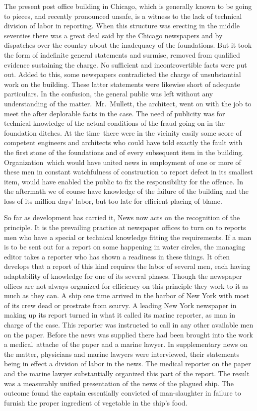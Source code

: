 \documentclass[openany,nobib]{tufte-book}
\begin{document}
The present post office building in Chicago, which is generally known to
be going to pieces, and recently pronounced unsafe, is a witness to the
lack of technical division of labor in reporting. When this structure
was erecting in the middle seventies there was a great deal said by the
Chicago newspapers and by dispatches over the country about the
inadequacy of the foundations. But it took the form of indefinite
general statements and surmise, removed from qualified evidence
sustaining the charge. No sufficient and incontrovertible facts were put
out. Added to this, some newspapers contradicted the charge of
unsubstantial work on the building. These latter statements were
likewise short of adequate particulars. In the confusion, the general
public was left without any understanding of the matter.~Mr.~Mullett,
the architect, went on with the job to meet the after deplorable facts
in the case. The need of publicity was for technical knowledge of the
actual conditions of the fraud going on in the foundation ditches. At
the time~there were in the vicinity easily some score of competent
engineers and architects who could have told exactly the fault with the
first stone of the foundations and of every subsequent item in the
building. Organization~which would have united news in employment of one
or more of these men in constant watchfulness of construction to report
defect in its smallest item, would have enabled the public to fix the
responsibility for the offence. In the aftermath we of course have
knowledge of the failure of the building and the loss of its million
days' labor, but too late for efficient placing of blame. ~

So far as development has carried it, News now acts on the recognition
of the principle. It is the prevailing practice at newspaper offices to
turn on to reports men who have a special or technical knowledge fitting
the requirements. If a man is to be sent out for a report on some
happening in water circles, the managing editor takes a reporter who has
shown a readiness in these things. It often develops that a report of
this kind requires the labor of several men, each having adaptability of
knowledge for one of its several phases. Though the newspaper offices
are not always organized for efficiency on this principle they work to
it as much as they can. A ship one time arrived in the harbor of New
York with most of its crew dead or prostrate from scurvy. A leading New
York newspaper in making up its report turned in what it called its
marine reporter, as man in charge of the case. This reporter was
instructed to call in any other available men on the paper. Before the
news was supplied there had been brought into the work a
medical~attache~of the paper and a marine lawyer. In supplementary news
on the matter, physicians and marine lawyers were interviewed, their
statements being in effect a division of labor in the news. The medical
reporter on the paper and the marine lawyer substantially organized this
part of the report. The result was a measurably unified presentation of
the news of the plagued ship. The outcome found the captain essentially
convicted of man-slaughter in failure to furnish the proper ingredient
of vegetable in the ship's food.~
\end{document}
